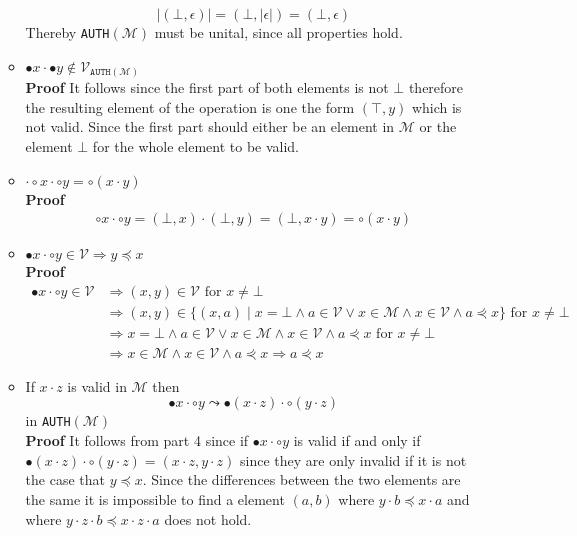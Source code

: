 \begin{itemize}
\begin{itemize}
   \begin{equation*}
     |(\bot, \epsilon)| = (\bot, |\epsilon|) = (\bot, \epsilon)
   \end{equation*}
  Thereby \texttt{AUTH}$(\mathcal M)$ must be unital, since all properties hold.
  \item $\bullet x \cdot \bullet y \notin \mathcal V_{\mathtt{AUTH}(\mathcal M)}$ \smallskip \\
  \textbf{Proof} It follows since the first part of both elements is not $\bot$ therefore the resulting element of the operation is one the form $(\top, y)$ which is not valid. Since the first part should either be an element in $\mathcal M$ or the element $\bot$ for the whole element to be valid.
  \item $\cdot \circ x \cdot \circ y=\circ(x \cdot y)$ \smallskip \\
  \textbf{Proof}
  \begin{align*}
    \circ x \cdot \circ y = (\bot, x) \cdot (\bot, y) = (\bot, x \cdot y) = \circ(x \cdot y)
  \end{align*}
  \item $\bullet x \cdot \circ y \in \mathcal{V} \Rightarrow y \preccurlyeq x$ \smallskip \\
  \textbf{Proof}
  \begin{align*}
     \bullet x \cdot \circ y \in \mathcal{V} &\Rightarrow (x,y) \in \mathcal V \text{ for } x \neq \bot \\
                                             &\Rightarrow (x,y) \in \{(x,a) \mid x = \bot \land a \in \mathcal V \lor x \in \mathcal M \land x \in \mathcal V \land a \curlyeqprec x\} \text{ for } x \neq \bot \\
                                             &\Rightarrow x = \bot \land a \in \mathcal V \lor x \in \mathcal M \land x \in \mathcal V \land a \curlyeqprec x \text{ for } x \neq \bot \\
                                             &\Rightarrow  x \in \mathcal M \land x \in \mathcal V \land a \curlyeqprec x \Rightarrow a \curlyeqprec x \
  \end{align*}
  \item If $x \cdot z$ is valid in $\mathcal M$ then
  \[
    \bullet x \cdot \circ y \leadsto \bullet(x \cdot z) \cdot \circ(y \cdot z)
  \]
  in \texttt{AUTH}$(\mathcal M)$ \smallskip \\
  \textbf{Proof} It follows from part 4 since if $\bullet x \cdot \circ y$ is valid if and only if $\bullet(x \cdot z) \cdot \circ(y \cdot z) = (x \cdot z, y \cdot z)$ since they are only invalid if it is not the case that $y \preccurlyeq x$. Since the differences between the two elements are the same it is impossible to find a element $(a,b)$ where $y \cdot b \preccurlyeq x \cdot a$ and where $y \cdot z \cdot b \preccurlyeq x \cdot z \cdot a$ does not hold.

\end{itemize}
\end{itemize}
